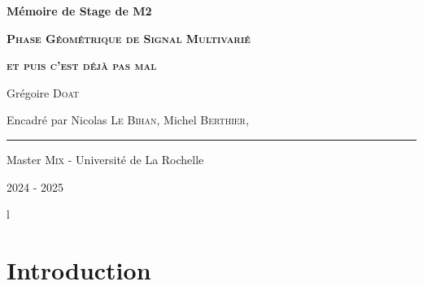 





\begin{titlepage}
	
	\centering
	\vspace{1.5cm}
	{\huge\textbf{Mémoire de Stage de M2}}\par
	
	\vspace{2cm}
	{\huge\textbf{\textsc{Phase Géométrique de Signal Multivarié}}}\par 
	\vspace{0.5cm}
	
	{\huge\textbf{\textsc{et puis c'est déjà pas mal}}}\par
	\vspace{2.0cm}
	
	{\large Grégoire \textsc{Doat}}\par
	\vspace{0.5cm}
	\vfill
	
	{\large Encadré par Nicolas \textsc{Le Bihan},  Michel \textsc{Berthier}, \etal}\par
	\vspace{0.5cm}
	
	\rule{10cm}{0.4pt}\par
	\vspace{0.7cm}
	
	{Master \textsc{Mix} - Université de La Rochelle}\par
	\vspace{0.25cm}
	
	{\large 2024 - 2025}
\end{titlepage}

\newpage
\tableofcontents
\thispagestyle{empty}
{\color{white}l}


\newpage
\setcounter{page}{1}



\newpage

{}
\section*{Introduction}


